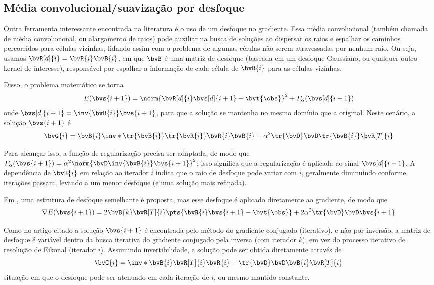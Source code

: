\subsection{Média convolucional/suavização por desfoque}

Outra ferramenta interessante encontrada na literatura \cite{phillips_traveltime_1991,meyerholtz_convolutional_1989} é o uso de um desfoque no gradiente. Essa média convolucional (também chamada de média convolucional, ou alargamento de raios) pode auxiliar na busca de soluções ao dispersar os raios e espalhar os caminhos percorridos para células vizinhas, lidando assim com o problema de algumas células não serem atravessadas por nenhum raio. Ou seja, usamos $\bvR[d]{i} = \bvR{i} \bvB{i}$, em que $\bvB$ é uma matriz de desfoque (baseada em um desfoque Gaussiano, ou qualquer outro kernel de interesse), responsável por espalhar a informação de cada célula de $\bvR{i}$ para as células vizinhas.

Disso, o problema matemático se torna
\begin{equation}	
	E(\bvs{i+1}) = \norm{\bvR[d]{i} \bvs[d]{i+1} - \bvt{\obs}}^2 + P_\alpha(\bvs[d]{i+1})
\end{equation}
onde $\bvs[d]{i+1} = \inv{\bvB{i}} \bvs{i+1}$, para que a solução se mantenha no mesmo domínio que a original. Neste cenário, a solução $\bvs{i+1}$ é
\begin{equation}	
	\bvG{i} = \bvB{i} \inv*{\tr{\bvB{i}} \tr{\bvR{i}} \bvR{i} \bvB{i} + \alpha^2 \tr{\bvD}\bvD} \tr{\bvB{i}} \bvR[T]{i}
\end{equation}

Para alcançar isso, a função de regularização precisa ser adaptada, de modo que $P_{\alpha}(\bvs{i+1}) = \alpha^2 \norm{\bvD \inv{\bvB{i}} \bvs{i+1}}^2$; isso significa que a regularização é aplicada ao sinal $\bvs[d]{i+1}$. A dependência de $\bvB{i}$ em relação ao iterador $i$ indica que o raio de desfoque pode variar com $i$, geralmente diminuindo conforme iterações passam, levando a um menor desfoque (e uma solução mais refinada).

Em \cite{ali_opensource_2019}, uma estrutura de desfoque semelhante é proposta, mas esse desfoque é aplicado diretamente ao gradiente, de modo que
\begin{equation}	
	\nabla E(\bvs{i+1}) = 2 \bvB{k} \bvR[T]{i}\pts{\bvR{i} \bvs{i+1} - \bvt{\obs}} + 2 \alpha^2 \tr{\bvD}\bvD \bvs{i+1}
\end{equation}

Como no artigo citado a solução $\bvs{i+1}$ é encontrada pelo método do gradiente conjugado (iterativo), e não por inversão, a matriz de desfoque é variável dentro da busca iterativa do gradiente conjugado pela inversa (com iterador $k$), em vez do processo iterativo de resolução de Eikonal (iterador $i$). Assumindo invertibilidade, a solução pode ser obtida diretamente através de
\begin{equation}		
	\bvG{i} = \inv*{\bvB{i} \bvR[T]{i} \bvR{i} + \tr{\bvD}\bvD}\bvB{i} \bvR[T]{i}
\end{equation}
situação em que o desfoque pode ser atenuado em cada iteração de $i$, ou mesmo mantido constante.


